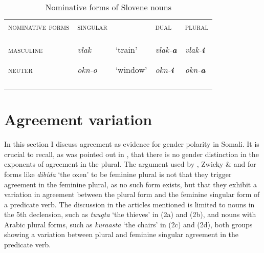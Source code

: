 \documentclass[output=paper]{langsci/langscibook}
\begin{document}
 
\begin{table}
\caption{Nominative forms of Slovene nouns}
\label{tab:8}
\begin{tabularx}{\textwidth}{XXXXX}
\lsptoprule
{\textsc{nominative forms}} & {\textsc{singular}} &  & {\textsc{dual}} & {\textsc{plural}}\\
{\textsc{masculine}}

{\textsc{neuter}} & {\textit{vlak}}

{\textit{okn-o}} & {‘train’}

{‘window’} & {\textit{vlak-}\textbf{\textit{a}}}

{\textit{okn-}\textbf{\textit{i}}} & {\textit{vlak-}\textbf{\textit{i}}}

{\textit{okn-}\textbf{\textit{a}}}\\
\lspbottomrule
\end{tabularx}

\end{table} 

\section{Agreement variation}

In this section I discuss agreement as evidence for gender polarity in Somali. It is crucial to recall, as was pointed out in , that there is no gender distinction in the exponents of agreement in the plural. The argument used by \citet{Hetzron1972}, Zwicky \& \citet{Pullum1983} and \citet{Lecarme2002} for forms like \textit{dibída} ‘the oxen’ to be feminine plural is not that they trigger agreement in the feminine plural, as no such form exists, but that they exhibit a variation in agreement between the plural form and the feminine singular form of a predicate verb. The discussion in the articles mentioned is limited to nouns in the 5th declension, such as \textit{tuugta} ‘the thieves’ in (2a) and (2b), and nouns with Arabic plural forms, such as \textit{kuraasta} ‘the chairs’ in (2c) and (2d), both groups showing a variation between plural and feminine singular agreement in the predicate verb.
\end{document}
